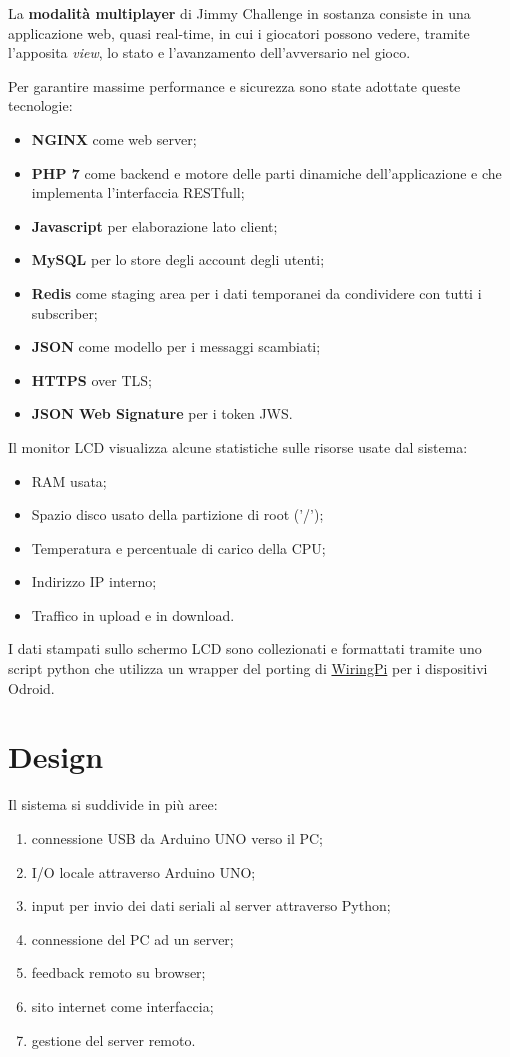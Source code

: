 La \textbf{modalità multiplayer} di Jimmy Challenge in sostanza consiste in una applicazione web, quasi real-time, in cui i giocatori possono vedere, tramite l'apposita \textit{view}, lo stato e l'avanzamento dell'avversario nel gioco.

Per garantire massime performance e sicurezza sono state adottate queste tecnologie:
\begin{itemize}
	\item \textbf{NGINX} come web server;
	\item \textbf{PHP 7} come backend e motore delle parti dinamiche dell'applicazione e che implementa l'interfaccia RESTfull;
	\item \textbf{Javascript} per elaborazione lato client;
	\item \textbf{MySQL} per lo store degli account degli utenti;
	\item \textbf{Redis} come staging area per i dati temporanei da condividere con tutti i subscriber;
	\item \textbf{JSON} come modello per i messaggi scambiati;
	\item \textbf{HTTPS} over TLS;
	\item \textbf{JSON Web Signature} per i token JWS.
\end{itemize}
Il monitor LCD visualizza alcune statistiche sulle risorse usate dal sistema:
\begin{itemize}
	\item RAM usata;
	\item Spazio disco usato della partizione di root ('/');
	\item Temperatura e percentuale di carico della CPU;
	\item Indirizzo IP interno;
	\item Traffico in upload e in download.
\end{itemize}
I dati stampati sullo schermo LCD sono collezionati e formattati tramite uno script python che utilizza un wrapper del porting di \href{https://github.com/hardkernel/WiringPi2-Python}{WiringPi} per i dispositivi Odroid.

\section{Design}
Il sistema si suddivide in più aree:
\begin{enumerate}
	\item connessione USB da Arduino UNO verso il PC;
	\item I/O locale attraverso Arduino UNO;
	\item input per invio dei dati seriali al server attraverso Python;
	\item connessione del PC ad un server;
	\item feedback remoto su browser;
	\item sito internet come interfaccia;
	\item gestione del server remoto.
\end{enumerate}

